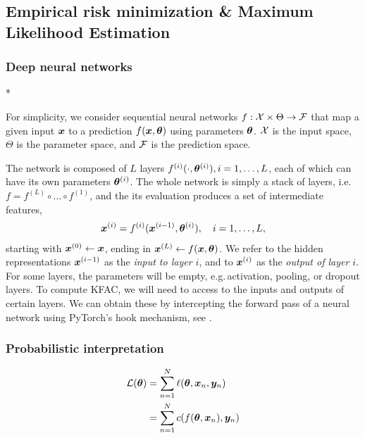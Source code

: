 \subsection{Empirical risk minimization \& Maximum Likelihood Estimation}

\subsubsection{Deep neural networks}

\switchcolumn[1]*
\switchcolumn[0]

For simplicity, we consider sequential neural networks $f: {\mathcal{X}} \times \Theta \to {\mathcal{F}}$ that map a given input ${\bm{x}}$ to a prediction $f({\bm{x}}, {\bm{\theta}})$ using parameters ${\bm{\theta}}$.
${\mathcal{X}}$ is the input space, $\Theta$ is the parameter space, and ${\mathcal{F}}$ is the prediction space.

The network is composed of $L$ layers $f^{(i)}(\cdot, {\bm{\theta}}^{(i)}), i=1,\dots, L$, each of which can have its own parameters ${\bm{\theta}}^{(i)}$.
The whole network is simply a stack of layers, i.e.
$f = f^{(L)} \circ \dots \circ f^{(1)}$, and the its evaluation produces a set of intermediate features,
\begin{align*}
  {\bm{x}}^{(i)} = f^{(i)}({\bm{x}}^{(i-1)}, {\bm{\theta}}^{(i)}), \quad i=1,\dots, L,
\end{align*}
starting with ${\bm{x}}^{(0)} \leftarrow {\bm{x}}$, ending in ${\bm{x}}^{(L)} \leftarrow f({\bm{x}}, {\bm{\theta}})$.
We refer to the hidden representations ${\bm{x}}^{(i-1)}$ as the \emph{input to layer $i$}, and to ${\bm{x}}^{(i)}$ as the \emph{output of layer $i$}.
For some layers, the parameters will be empty, e.g.\,activation, pooling, or dropout layers.
To compute KFAC, we will need to access to the inputs and outputs of certain layers.
We can obtain these by intercepting the forward pass of a neural network using PyTorch's hook mechanism, see .

\subsubsection{Probabilistic interpretation}


\begin{align}
  {\mathcal{L}}({\bm{\theta}}) &= \sum_{n=1}^N \ell({\bm{\theta}}, {\bm{x}}_n, {\bm{y}}_n)
  \\
               &=
                 \sum_{n=1}^N c(f({\bm{\theta}}, {\bm{x}}_n), {\bm{y}}_n)
\end{align}

\switchcolumn[0]

